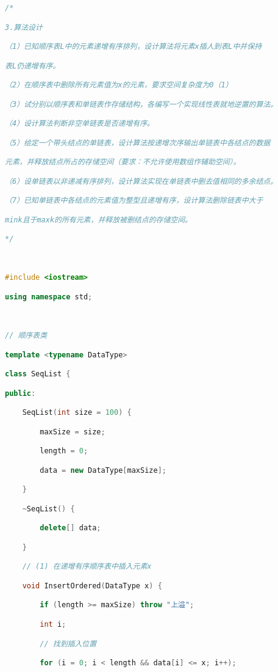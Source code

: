 \begin{lstlisting}[language=C++]
/*

3.算法设计

（1）已知顺序表L中的元素递增有序排列，设计算法将元素x插人到表L中并保持

表L仍递增有序。

（2）在顺序表中删除所有元素值为x的元素，要求空间复杂度为0（1）

（3）试分别以顺序表和单链表作存储结构，各编写一个实现线性表就地逆置的算法。

（4）设计算法判断非空单链表是否递增有序。

（5）给定一个带头结点的单链表，设计算法按递增次序输出单链表中各结点的数据

元素，并释放结点所占的存储空间（要求：不允许使用数组作辅助空间）。

（6）设单链表以非递减有序排列，设计算法实现在单链表中删去值相同的多余结点。

（7）已知单链表中各结点的元素值为整型且递增有序，设计算法删除链表中大于

mink且于maxk的所有元素，并释放被删结点的存储空间。

*/

  

#include <iostream>

using namespace std;

  

// 顺序表类

template <typename DataType>

class SeqList {

public:

    SeqList(int size = 100) {

        maxSize = size;

        length = 0;

        data = new DataType[maxSize];

    }

    ~SeqList() {

        delete[] data;

    }

    // (1) 在递增有序顺序表中插入元素x

    void InsertOrdered(DataType x) {

        if (length >= maxSize) throw "上溢";

        int i;

        // 找到插入位置

        for (i = 0; i < length && data[i] <= x; i++);


\end{lstlisting}
